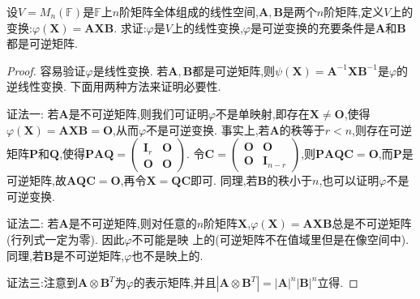 \documentclass[../../main.tex]{subfiles}%
\begin{document}
\begin{example}
设\(V = M_n(\mathbb{F})\)是\(\mathbb{F}\)上\(n\)阶矩阵全体组成的线性空间,\(\boldsymbol{A},\boldsymbol{B}\)是两个\(n\)阶矩阵,定义\(V\)上的变换:\(\varphi(\boldsymbol{X})=\boldsymbol{A}\boldsymbol{X}\boldsymbol{B}\). 求证:\(\varphi\)是\(V\)上的线性变换,\(\varphi\)是可逆变换的充要条件是\(\boldsymbol{A}\)和\(\boldsymbol{B}\)都是可逆矩阵.
\end{example}
\begin{proof}

容易验证\(\varphi\)是线性变换. 若\(\boldsymbol{A},\boldsymbol{B}\)都是可逆矩阵,则\(\psi(\boldsymbol{X})=\boldsymbol{A}^{-1}\boldsymbol{X}\boldsymbol{B}^{-1}\)是\(\varphi\)的逆线性变换. 下面用两种方法来证明必要性.

{\color{blue}证法一:} 若\(\boldsymbol{A}\)是不可逆矩阵,则我们可证明\(\varphi\)不是单映射,即存在\(\boldsymbol{X}\neq\boldsymbol{O}\),使得\(\varphi(\boldsymbol{X})=\boldsymbol{A}\boldsymbol{X}\boldsymbol{B}=\boldsymbol{O}\),从而\(\varphi\)不是可逆变换. 事实上,若\(\boldsymbol{A}\)的秩等于\(r < n\),则存在可逆矩阵\(\boldsymbol{P}\)和\(\boldsymbol{Q}\),使得\(\boldsymbol{P}\boldsymbol{A}\boldsymbol{Q}=\begin{pmatrix}\boldsymbol{I}_r&\boldsymbol{O}\\\boldsymbol{O}&\boldsymbol{O}\end{pmatrix}\). 令\(\boldsymbol{C}=\begin{pmatrix}\boldsymbol{O}&\boldsymbol{O}\\\boldsymbol{O}&\boldsymbol{I}_{n - r}\end{pmatrix}\),则\(\boldsymbol{P}\boldsymbol{A}\boldsymbol{Q}\boldsymbol{C}=\boldsymbol{O}\),而\(\boldsymbol{P}\)是可逆矩阵,故\(\boldsymbol{A}\boldsymbol{Q}\boldsymbol{C}=\boldsymbol{O}\),再令\(\boldsymbol{X}=\boldsymbol{Q}\boldsymbol{C}\)即可. 同理,若\(\boldsymbol{B}\)的秩小于\(n\),也可以证明\(\varphi\)不是可逆变换.

{\color{blue}证法二:} 若\(\boldsymbol{A}\)是不可逆矩阵,则对任意的\(n\)阶矩阵\(\boldsymbol{X}\),\(\varphi(\boldsymbol{X})=\boldsymbol{A}\boldsymbol{X}\boldsymbol{B}\)总是不可逆矩阵(行列式一定为零). 因此\(\varphi\)不可能是映
上的(可逆矩阵不在值域里但是在像空间中). 同理,若\(\boldsymbol{B}\)是不可逆矩阵,\(\varphi\)也不是映上的.

{\color{blue}证法三:}注意到$\boldsymbol{A}\otimes \boldsymbol{B}^T$为$\varphi$的表示矩阵,并且$\left| \boldsymbol{A}\otimes \boldsymbol{B}^T \right|=\left| \boldsymbol{A} \right|^n\left| \boldsymbol{B} \right|^n$立得.

\end{proof}
\end{document}

